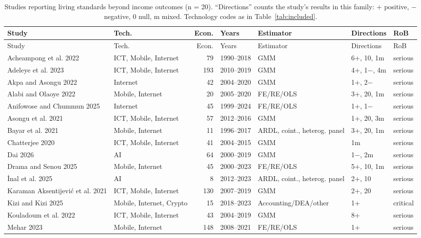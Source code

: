 {\scriptsize\setlength{\tabcolsep}{3pt}
\begin{longtable}{@{}p{3.1cm} p{1.9cm} r l p{2.4cm} p{2.3cm} l@{}}
\caption{Studies reporting living standards beyond income outcomes (n = 20). ``Directions'' counts the study's results in this family: $+$ positive, $-$ negative, 0 null, m mixed. Technology codes as in Table~\ref{tab:included}.}\label{tab:fam5}\\
\toprule Study & Tech. & Econ. & Years & Estimator & Directions & RoB \\ \midrule \endfirsthead
\toprule Study & Tech. & Econ. & Years & Estimator & Directions & RoB \\ \midrule \endhead
\bottomrule \endfoot
Acheampong et al. 2022 & ICT, Mobile, Internet & 79 & 1990--2018 & GMM & 6+, 10, 1m & serious \\
Adeleye et al. 2023 & ICT, Mobile, Internet & 193 & 2010--2019 & GMM & 4+, 1$-$, 4m & serious \\
Akpa and Asongu 2022 & Internet & 42 & 2004--2020 & GMM & 1+, 2$-$ & serious \\
Alabi and Olaoye 2022 & Mobile, Internet & 20 & 2005--2020 & FE/RE/OLS & 3+, 20, 1m & serious \\
Anifowose and Chummun 2025 & Internet & 45 & 1999--2024 & FE/RE/OLS & 1+, 1$-$ & serious \\
Asongu et al. 2021 & ICT, Mobile, Internet & 57 & 2012--2016 & GMM & 1+, 20, 3m & serious \\
Bayar et al. 2021 & Mobile, Internet & 11 & 1996--2017 & ARDL, coint., heterog. panel & 3+, 20, 1m & serious \\
Chatterjee 2020 & ICT, Mobile, Internet & 41 & 2004--2015 & GMM & 1m & serious \\
Dai 2026 & AI & 64 & 2000--2019 & GMM & 1$-$, 2m & serious \\
Drama and Senou 2025 & Mobile, Internet & 45 & 2000--2023 & FE/RE/OLS & 5+, 10, 1m & serious \\
İnal et al. 2025 & AI & 8 & 2012--2023 & ARDL, coint., heterog. panel & 2+, 10 & serious \\
Karaman Aksentijević et al. 2021 & ICT, Mobile, Internet & 130 & 2007--2019 & GMM & 2+, 20 & serious \\
Kizi and Kizi 2025 & Mobile, Internet, Crypto & 15 & 2018--2023 & Accounting/DEA/other & 1+ & critical \\
Kouladoum et al. 2022 & ICT, Mobile, Internet & 43 & 2004--2019 & GMM & 8+ & serious \\
Mehar 2023 & Mobile, Internet & 148 & 2008--2021 & FE/RE/OLS & 1+ & serious \\

\end{longtable}}
